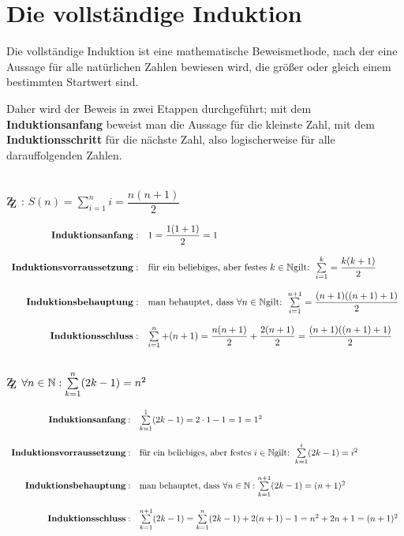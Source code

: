 \documentclass[main.tex]{subfiles}
\begin{document}
\section{Die vollständige Induktion}

Die vollständige Induktion ist eine mathematische Beweismethode, nach der eine Aussage für alle natürlichen Zahlen bewiesen wird, die größer oder gleich einem bestimmten Startwert sind.

Daher wird der Beweis in zwei Etappen durchgeführt; mit dem \textbf{Induktionsanfang} beweist man die Aussage für die kleinste Zahl, mit dem \textbf{Induktionsschritt} für die nächste Zahl, also logischerweise für alle darauffolgenden Zahlen.\\\\

\begin{Beweis}
	$\zz$ : $S(n) = \sum\limits_{i=1}^n i  = \dfrac{n(n+1)}{2}$

	$\begin{array}{rl}
		\textbf{Induktionsanfang}: & 1=\dfrac{1(1+1)}{2} = 1  \\\\
		\textbf{Induktionsvorraussetzung}: & \text{für ein beliebiges, aber festes } k \in \mathbb{N} \text{gilt: } \sum\limits_{i=1}^k  = \dfrac{k(k+1)}{2}\\\\
		\textbf{Induktionsbehauptung}: & \text{man behauptet, dass } \forall n \in \mathbb{N} \text{gilt: } \sum\limits_{i=1}^{n+1}  = \dfrac{(n+1)((n+1)+1)}{2}\\\\
		\textbf{Induktionsschluss}: &  \sum\limits_{i=1}^n + (n+1) = \dfrac{n(n+1)}{2} + \dfrac{2(n+1)}{2} = \dfrac{(n+1)((n+1)+1)}{2}\\\\
	\end{array}$
\end{Beweis}

\begin{Beweis}
	$\zz$ $\forall n \in \mathbb{N}  :  \sum\limits_{k=1}^n (2k-1) = n^2$

	$\begin{array}{rl}
		\textbf{Induktionsanfang}: & \sum\limits_{k=1}^1 (2k-1) = 2\cdot 1 -1 = 1 = 1^2  \\\\
		\textbf{Induktionsvorraussetzung}: & \text{für ein beliebiges, aber festes } i \in \mathbb{N} \text{gilt: } \sum\limits_{k=1}^i (2k-1) = i^2 \\\\
		\textbf{Induktionsbehauptung}: & \text{man behauptet, dass } \forall n \in \mathbb{N} :  \sum\limits_{k=1}^{n+1} (2k-1) = (n+1)^2 \\\\
		\textbf{Induktionsschluss}: & \sum\limits_{k=1}^{n+1} (2k-1) = \sum\limits_{k=1}^{n} (2k-1) + 2(n+1)-1 = n^2 +2n+1 = (n+1)^2 
	\end{array}$
\end{Beweis}
\end{document}
